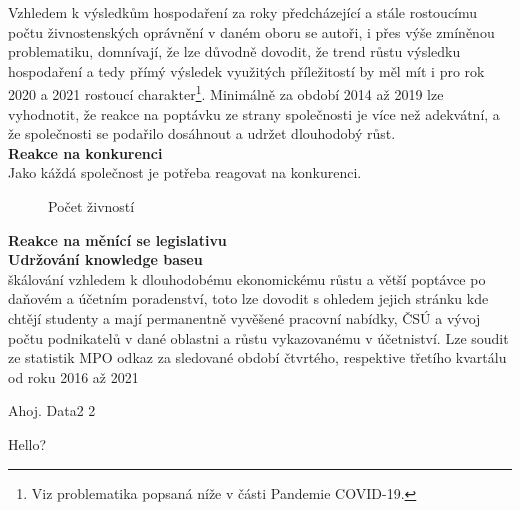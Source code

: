 \newpage

 Vzhledem k výsledkům hospodaření za roky předcházející a stále rostoucímu počtu živnostenských oprávnění v daném oboru se autoři, i přes výše zmíněnou problematiku, domnívají, že lze důvodně dovodit, že trend růstu výsledku hospodaření a tedy přímý výsledek využitých příležitostí by měl mít i pro rok 2020 a 2021 rostoucí charakter\footnote{Viz problematika popsaná níže v části Pandemie COVID-19.}. Minimálně za období 2014 až 2019 lze vyhodnotit, že reakce na poptávku ze strany společnosti je více než adekvátní, a že společnosti se podařilo dosáhnout a udržet dlouhodobý růst.\\



\textbf{Reakce na konkurenci}\\

Jako káždá společnost je potřeba reagovat na konkurenci.

\begin{figure}[!htbp]
	\caption{Počet živností}
	\label{fig:pz}
\end{figure}

\textbf{Reakce na měnící se legislativu}\\

\textbf{Udržování knowledge baseu}\\


škálování vzhledem k dlouhodobému ekonomickému růstu a větší poptávce po daňovém a účetním poradenství, toto lze dovodit s ohledem jejich stránku kde chtějí studenty a mají permanentně vyvěšené pracovní nabídky, ČSÚ a vývoj počtu podnikatelů v dané oblastni a růstu vykazovanému v účetniství. Lze soudit ze statistik MPO odkaz za sledované období čtvrtého, respektive třetího kvartálu od roku 2016 až 2021

Ahoj.
Data2 2

Hello?

%

